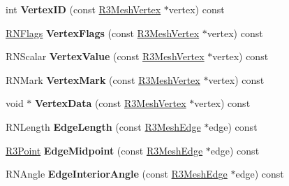 \begin{DoxyCompactItemize}
\item 
int {\bfseries Vertex\+ID} (const \hyperlink{class_r3_mesh_vertex}{R3\+Mesh\+Vertex} $\ast$vertex) const \hypertarget{class_r3_mesh_a3eba605dcab0c2b5c4054eb877faff37}{}\label{class_r3_mesh_a3eba605dcab0c2b5c4054eb877faff37}

\item 
\hyperlink{class_r_n_flags}{R\+N\+Flags} {\bfseries Vertex\+Flags} (const \hyperlink{class_r3_mesh_vertex}{R3\+Mesh\+Vertex} $\ast$vertex) const \hypertarget{class_r3_mesh_a7374b730592ab63610ad44278f7d904d}{}\label{class_r3_mesh_a7374b730592ab63610ad44278f7d904d}

\item 
R\+N\+Scalar {\bfseries Vertex\+Value} (const \hyperlink{class_r3_mesh_vertex}{R3\+Mesh\+Vertex} $\ast$vertex) const \hypertarget{class_r3_mesh_a5003ff9c01f4b92398b7403bb85f00bc}{}\label{class_r3_mesh_a5003ff9c01f4b92398b7403bb85f00bc}

\item 
R\+N\+Mark {\bfseries Vertex\+Mark} (const \hyperlink{class_r3_mesh_vertex}{R3\+Mesh\+Vertex} $\ast$vertex) const \hypertarget{class_r3_mesh_a186d1c38fbcde94f463fbd829233865f}{}\label{class_r3_mesh_a186d1c38fbcde94f463fbd829233865f}

\item 
void $\ast$ {\bfseries Vertex\+Data} (const \hyperlink{class_r3_mesh_vertex}{R3\+Mesh\+Vertex} $\ast$vertex) const \hypertarget{class_r3_mesh_af20f0c080ef9ca811d20ee4f7cbda1fb}{}\label{class_r3_mesh_af20f0c080ef9ca811d20ee4f7cbda1fb}

\item 
R\+N\+Length {\bfseries Edge\+Length} (const \hyperlink{class_r3_mesh_edge}{R3\+Mesh\+Edge} $\ast$edge) const \hypertarget{class_r3_mesh_a734318568d8c7a3fbf85758faead3a8b}{}\label{class_r3_mesh_a734318568d8c7a3fbf85758faead3a8b}

\item 
\hyperlink{class_r3_point}{R3\+Point} {\bfseries Edge\+Midpoint} (const \hyperlink{class_r3_mesh_edge}{R3\+Mesh\+Edge} $\ast$edge) const \hypertarget{class_r3_mesh_a14a5d6028d0245437146c49f5b002acd}{}\label{class_r3_mesh_a14a5d6028d0245437146c49f5b002acd}

\item 
R\+N\+Angle {\bfseries Edge\+Interior\+Angle} (const \hyperlink{class_r3_mesh_edge}{R3\+Mesh\+Edge} $\ast$edge) const \hypertarget{class_r3_mesh_ac8c8094c155a9dd01eb6e7e620bc34a8}{}\label{class_r3_mesh_ac8c8094c155a9dd01eb6e7e620bc34a8}


\end{DoxyCompactItemize}
